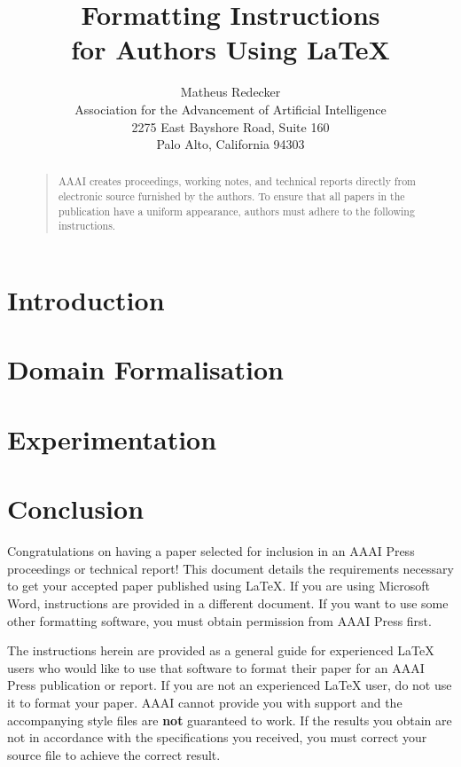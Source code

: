 \documentclass[letterpaper]{article}
\begin{document}
%
\title{Formatting Instructions \\for Authors Using \LaTeX{}}
\author{Matheus Redecker\\
Association for the Advancement of Artificial Intelligence\\
2275 East Bayshore Road, Suite 160\\
Palo Alto, California 94303\\
}
\maketitle
\begin{abstract}
\begin{quote}
AAAI creates proceedings, working notes, and technical reports directly from electronic source furnished by the authors. To ensure that all papers in the publication have a uniform appearance, authors must adhere to the following instructions. 
\end{quote}
\end{abstract}

\section{Introduction}
\section{Domain Formalisation}
\section{Experimentation}
\section{Conclusion}


\noindent Congratulations on having a paper selected for inclusion in an AAAI Press proceedings or technical report! This document details the requirements necessary to get your accepted paper published using \LaTeX{}. If you are using Microsoft Word, instructions are provided in a different document. If you want to use some other formatting software, you must obtain permission from AAAI Press first. 

The instructions herein are provided as a general guide for experienced \LaTeX{} users who would like to use that software to format their paper for an AAAI Press publication or report. If you are not an experienced \LaTeX{} user, do not use it to format your paper. AAAI cannot provide you with support and the accompanying style files are \textbf{not} guaranteed to work. If the results you obtain are not in accordance with the specifications you received, you must correct your source file to achieve the correct result. 
\end{document}

